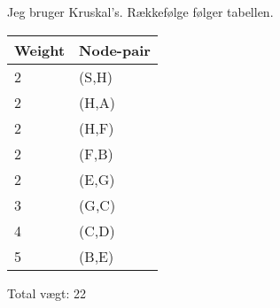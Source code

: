 \documentclass{article}
\begin{document}
Jeg bruger Kruskal's. Rækkefølge følger tabellen.
\begin{table}[H]
\centering
\begin{tabular}{|l|l|}
\hline
\rowcolor[HTML]{C0C0C0} 
Weight  & Node-pair \\ \hline
2       & (S,H)     \\ \hline
2       & (H,A)     \\ \hline
2       & (H,F)     \\ \hline
2       & (F,B)     \\ \hline
2       & (E,G)     \\ \hline
3       & (G,C)     \\ \hline
4       & (C,D)     \\ \hline
5       & (B,E)     \\ \hline
\end{tabular}
\end{table}
Total vægt: 22
\end{document}
